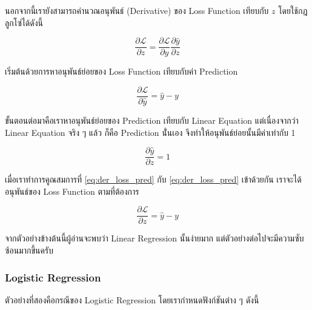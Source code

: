 \vspace{1em}
นอกจากนี้เรายังสามารถคำนวณอนุพันธ์ (Derivative) ของ Loss Function เทียบกับ $z$ โดยใช้กฎลูกโซ่ได้ดังนี้

\begin{equation}\label{eq:loss_chain_rule}
    \frac{\partial \mathcal{L}}{\partial z} =
    \frac{\partial \mathcal{L}}{\partial \hat{y}} \frac{\partial \hat{y}}{\partial z}
\end{equation}

\noindent เริ่มต้นด้วยการหาอนุพันธ์ย่อยของ Loss Function เทียบกับค่า Prediction

\begin{equation}\label{eq:der_loss_pred}
    \frac{\partial \mathcal{L}}{\partial \hat{y}} = \hat{y} - y
\end{equation}

\noindent ขั้นตอนต่อมาคือเราหาอนุพันธ์ย่อยของ Prediction เทียบกับ Linear Equation แต่เนื่องจากว่า Linear Equation จริง ๆ แล้ว%
ก็คือ Prediction นั่่นเอง จึงทำให้อนุพันธ์ย่อยนั้นมีค่าเท่ากับ 1

\begin{equation}\label{eq:der_pred_lin_eq}
    \frac{\partial \hat{y}}{\partial z} = 1
\end{equation}

\noindent เมื่อเราทำการคูณสมการที่ \eqref{eq:der_loss_pred} กับ \eqref{eq:der_loss_pred} เข้าด้วยกัน เราจะได้อนุพันธ์ของ Loss
Function ตามที่ต้องการ

\begin{equation}\label{eq:der_loss_lin_eq}
    \frac{\partial \mathcal{L}}{\partial z} = \hat{y} - y
\end{equation}

\noindent จากตัวอย่างข้างต้นนี้ผู้อ่านจะพบว่า Linear Regression นั้นง่ายมาก แต่ตัวอย่างต่อไปจะมีความซับซ้อนมากขึ้นครับ

\subsubsection{Logistic Regression}

ตัวอย่างที่สองคือกรณีของ Logistic Regression โดยเรากำหนดฟังก์ชันต่าง ๆ ดังนี้



